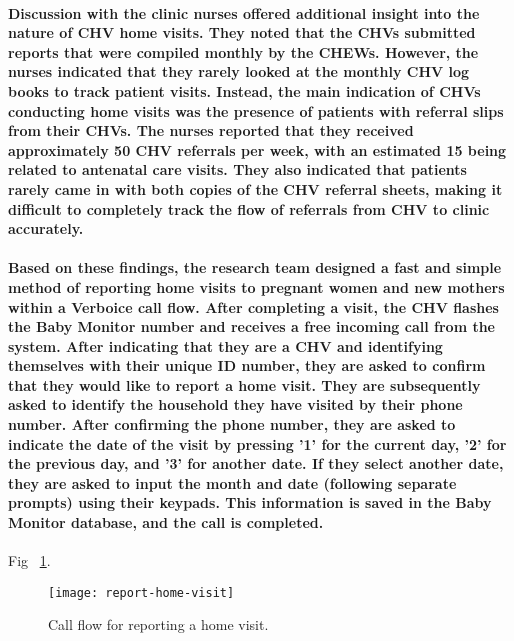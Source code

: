 \paragraph{Discussion with the clinic nurses offered additional insight into the nature of CHV home visits. They noted that the CHVs submitted reports that were compiled monthly by the CHEWs. However, the nurses indicated that they rarely looked at the monthly CHV log books to track patient visits. Instead, the main indication of CHVs conducting home visits was the presence of patients with referral slips from their CHVs. The nurses reported that they received approximately 50 CHV referrals per week, with an estimated 15 being related to antenatal care visits. They also indicated that patients rarely came in with both copies of the CHV referral sheets, making it difficult to completely track the flow of referrals from CHV to clinic accurately.}

\paragraph{Based on these findings, the research team designed a fast and simple method of reporting home visits to pregnant women and new mothers within a Verboice call flow. After completing a visit, the CHV flashes the Baby Monitor number and receives a free incoming call from the system. After indicating that they are a CHV and identifying themselves with their unique ID number, they are asked to confirm that they would like to report a home visit. They are subsequently asked to identify the household they have visited by  their phone number. After confirming the phone number, they are asked to indicate the date of the visit by pressing '1' for the current day, '2' for the previous day, and '3' for another date. If they select another date, they are asked to input the month and date (following separate prompts) using their keypads. This information is saved in the Baby Monitor database, and the call is completed.}

Fig ~\ref{fig:homevisit}.
\begin{figure}[]
	\begin{center}
	\texttt{[image: report-home-visit]}
	\end{center}
	\caption{Call flow for reporting a home visit.}
	\label{fig:homevisit}
\end{figure}

